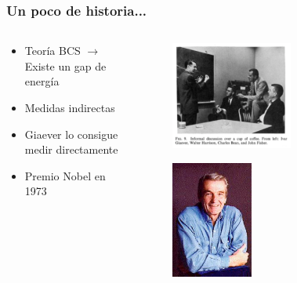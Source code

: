 \frame{\tableofcontents}

\begin{frame}
\frametitle{Un poco de historia...}

\begin{columns}
\begin{column}{0.5\textwidth}
	\begin{itemize}
		\item{Teor\'ia BCS $\longrightarrow$ Existe un gap de energ\'ia}
		\item{Medidas indirectas}
		\item{Giaever lo consigue medir directamente}
		\item{Premio Nobel en 1973}
	\end{itemize}
\end{column}
\begin{column}{0.5\textwidth}
	\begin{figure}[!h] \label{giaever60}
	\includegraphics[width=0.6\textwidth]{giaever60}
	\end{figure}
	\begin{figure}[!h] \label{giaever99}
	\includegraphics[width=0.4\textwidth]{giaever99}
	\end{figure}
\end{column}
\end{columns}

\end{frame}
